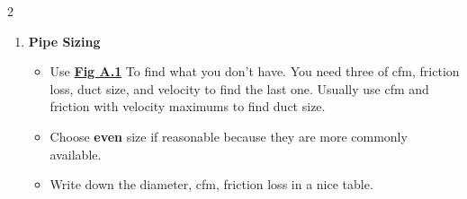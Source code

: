 \begin{multicols*}{2}
\begin{enumerate}
        \item \textbf{Pipe Sizing}
              \begin{itemize}
                  \item Use \underline{\textbf{Fig A.1}} To find what you don't have. You need three of cfm, friction loss, duct size, and velocity to find the last one. Usually use cfm and friction with velocity maximums to find duct size.
                  \item Choose \textbf{even} size if reasonable because they are more commonly available.
                  \item Write down the diameter, cfm, friction loss in a nice table.
              \end{itemize}



\end{enumerate}
\end{multicols*}
